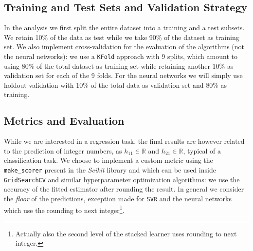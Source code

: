 \subsection{Training and Test Sets and Validation Strategy}
    In the analysis we first split the entire dataset into a training and a test subsets. We retain 10\% of the data as test while we take 90\% of the dataset as training set. We also implement cross-validation for the evaluation of the algorithms (not the neural networks): we use a \texttt{KFold} approach with 9 splits, which amount to using 80\% of the total dataset as training set while retaining another 10\% as validation set for each of the 9 folds. For the neural networks we will simply use holdout validation with 10\% of the total data as validation set and 80\% as training.
    
\subsection{Metrics and Evaluation}
    While we are interested in a regression task, the final results are however related to the prediction of integer numbers, as $h_{11} \in \mathds{R}$ and $h_{21} \in \mathds{R}$, typical of a classification task. We choose to implement a custom metric using the \texttt{make\_scorer} present in the \textit{Scikit} library and which can be used inside \texttt{GridSearchCV} and similar hyperparameter optimization algorithms: we use the accuracy of the fitted estimator after rounding the result. In general we consider the \textit{floor} of the predictions, exception made for \texttt{SVR} and the neural networks which use the rounding to next integer\footnote{Actually also the second level of the stacked learner uses rounding to next integer.}.

